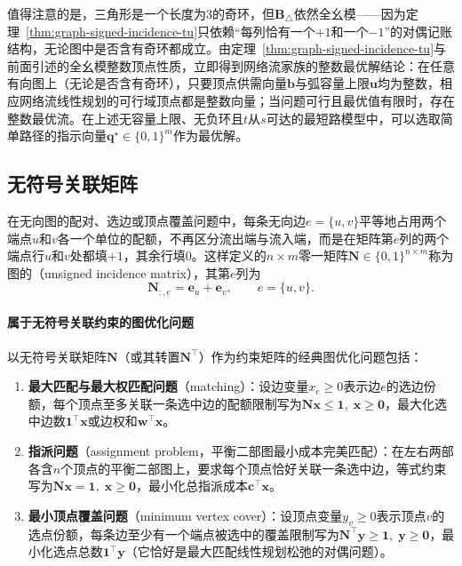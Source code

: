值得注意的是，三角形是一个长度为$3$的奇环，但$\bm{B}_\triangle$依然全幺模——因为定理~\ref{thm:graph-signed-incidence-tu}只依赖“每列恰有一个$+1$和一个$-1$”的对偶记账结构，无论图中是否含有奇环都成立。由定理~\ref{thm:graph-signed-incidence-tu}与前面引述的全幺模整数顶点性质，立即得到网络流家族的整数最优解结论：在任意有向图上（无论是否含有奇环），只要顶点供需向量$\bm{b}$与弧容量上限$\bm{u}$均为整数，相应网络流线性规划的可行域顶点都是整数向量；当问题可行且最优值有限时，存在整数最优流。在上述无容量上限、无负环且$t$从$s$可达的最短路模型中，可以选取简单路径的指示向量$\bm{q}^\star\in\{0,1\}^m$作为最优解。

\subsection{无符号关联矩阵}
\label{sec:incidence-unsigned-tu}

在无向图的配对、选边或顶点覆盖问题中，每条无向边$e=\{u,v\}$平等地占用两个端点$u$和$v$各一个单位的配额，不再区分流出端与流入端，而是在矩阵第$e$列的两个端点行$u$和$v$处都填$+1$，其余行填$0$。这样定义的$n\times m$零一矩阵$\bm{N}\in\{0,1\}^{n\times m}$称为图的（unsigned incidence matrix），其第$e$列为
\[
\bm{N}_{:,e}=\bm{e}_u+\bm{e}_v,\qquad e=\{u,v\}.
\]

\paragraph{属于无符号关联约束的图优化问题}

以无符号关联矩阵$\bm{N}$（或其转置$\bm{N}^\top$）作为约束矩阵的经典图优化问题包括：
\begin{enumerate}
\item \textbf{最大匹配与最大权匹配问题}（matching）：设边变量$x_e\geq 0$表示边$e$的选边份额，每个顶点至多关联一条选中边的配额限制写为$\bm{N}\bm{x}\leq\bm{1},\;\bm{x}\geq\bm{0}$，最大化选中边数$\bm{1}^\top\bm{x}$或边权和$\bm{w}^\top\bm{x}$。
\item \textbf{指派问题}（assignment problem，平衡二部图最小成本完美匹配）：在左右两部各含$n$个顶点的平衡二部图上，要求每个顶点恰好关联一条选中边，等式约束写为$\bm{N}\bm{x}=\bm{1},\;\bm{x}\geq\bm{0}$，最小化总指派成本$\bm{c}^\top\bm{x}$。
\item \textbf{最小顶点覆盖问题}（minimum vertex cover）：设顶点变量$y_v\geq 0$表示顶点$v$的选点份额，每条边至少有一个端点被选中的覆盖限制写为$\bm{N}^\top\bm{y}\geq\bm{1},\;\bm{y}\geq\bm{0}$，最小化选点总数$\bm{1}^\top\bm{y}$（它恰好是最大匹配线性规划松弛的对偶问题）。
\end{enumerate}

